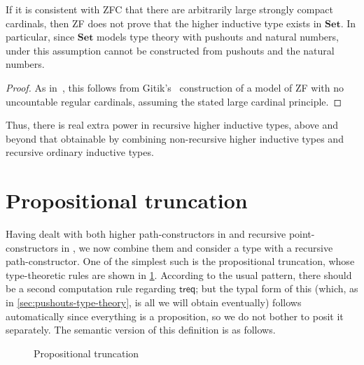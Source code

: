 \documentclass[referee]{psp}
\let\sec\S
\let\S\cS
\def\tr{\mathsf{tr}}
\def\treq{\mathsf{treq}}
\def\trrec{\mathsf{trrec}}
\let\type\fibtype
\renewcommand{\idover}[4][]{\fId_{#1}^{#4}(#2,#3)}
\begin{document}
\begin{cor}
  If it is consistent with ZFC that there are arbitrarily large strongly compact cardinals, then ZF does not prove that the higher inductive type \iF exists in $\mathbf{Set}$.
  In particular, since $\mathbf{Set}$ models type theory with pushouts and natural numbers, under this assumption \iF cannot be constructed from pushouts and the natural numbers.
\end{cor}
\begin{proof}
  As in~\cite[\sec9]{blass:freealg}, this follows from Gitik's~\cite{gitik:unc-sing} construction of a model of ZF with no uncountable regular cardinals, assuming the stated large cardinal principle.
\end{proof}

Thus, there is real extra power in recursive higher inductive types, above and beyond that obtainable by combining non-recursive higher inductive types and recursive ordinary inductive types.


\section{Propositional truncation}
\label{sec:prop-trunc}

Having dealt with both higher path-constructors in  and recursive point-constructors in , we now combine them and consider a type with a recursive path-constructor.
One of the simplest such is the propositional truncation, whose type-theoretic rules are shown in \cref{fig:proptrunc}.
According to the usual pattern, there should be a second computation rule regarding $\treq$; but the typal form of this (which, as in \cref{sec:pushouts-type-theory}, is all we will obtain eventually) follows automatically since everything is a proposition, so we do not bother to posit it separately.
The semantic version of this definition is as follows.

\begin{figure}
  \centering
  \caption{Propositional truncation}
  \label{fig:proptrunc}
\end{figure}
\end{document}
